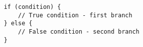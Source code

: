 
\begin{lstlisting}
	if (condition) {
		// True condition - first branch
	} else {
		// False condition - second branch
	}
\end{lstlisting}
